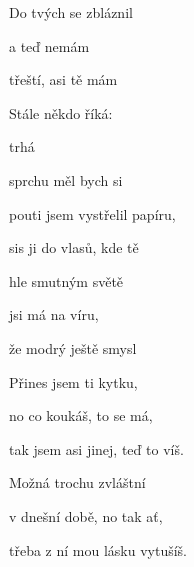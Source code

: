 

\zs
Do tvých  se zbláznil

a teď  nemám 

 třeští, asi tě mám 

Stále někdo říká: 

 trhá 

 sprchu měl bych si 
\ks

\zr
{} pouti jsem vystřelil  papíru,

 sis ji do vlasů, kde  tě 

hle smutným světě

jsi má  na víru,

že  modrý ještě smysl 
\kr

\zs
Přines jsem ti kytku,

no co koukáš, to se má,

tak jsem asi jinej, teď to víš.

Možná trochu zvláštní

v dnešní době, no tak ať,

třeba z ní mou lásku vytušíš.
\ks

\zr \kr
\kp





